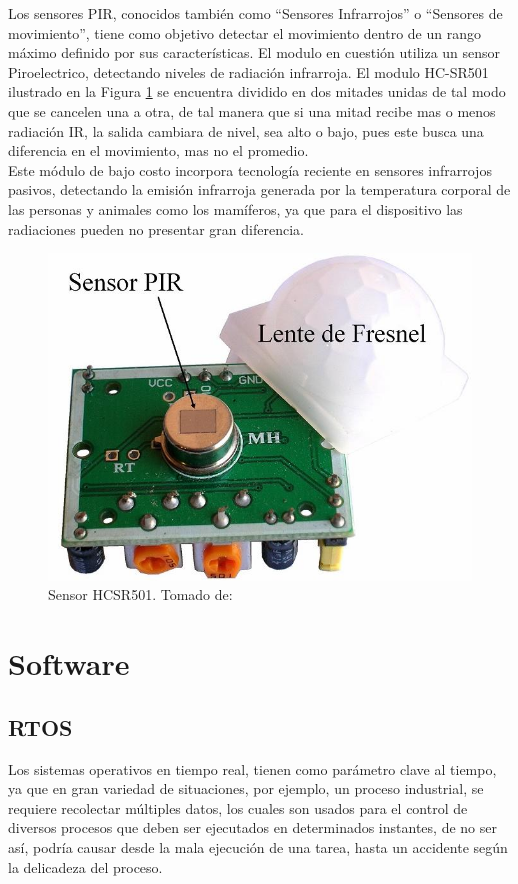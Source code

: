 Los sensores PIR, conocidos también como ``Sensores Infrarrojos'' o ``Sensores de movimiento'', tiene como objetivo detectar el movimiento dentro de un rango máximo definido por sus características. El modulo en cuestión utiliza un sensor Piroelectrico, detectando niveles de radiación infrarroja. El modulo HC-SR501 ilustrado en la Figura \ref{fig:sensor-hc-sr501-1000-m} se encuentra dividido en dos mitades unidas de tal modo que se cancelen una a otra, de tal manera que si una mitad recibe mas o menos radiación IR, la salida cambiara de nivel, sea alto o bajo, pues este busca una diferencia en el movimiento, mas no el promedio. \cite{PIR1}\\

Este módulo de bajo costo incorpora tecnología reciente en sensores infrarrojos pasivos, detectando la emisión infrarroja generada por la temperatura corporal de las personas y animales como los mamíferos, ya que para el dispositivo las radiaciones pueden no presentar gran diferencia. \cite{PIR2}\\


\begin{figure}[H]
	\centering
	\caption[Sensor HCSR501.]{Sensor HCSR501. Tomado de: \cite{PIR2}}
	\label{fig:sensor-hc-sr501-1000-m}
	\includegraphics[width=0.5\linewidth]{Imagenes/SENSOR-HC-SR501-1000-M}
\end{figure}

\section{Software}

\subsection{RTOS}

Los sistemas operativos en tiempo real, tienen como parámetro clave al tiempo, ya que en gran variedad de situaciones, por ejemplo, un proceso industrial, se requiere recolectar múltiples datos, los cuales son usados para el control de diversos procesos que deben ser ejecutados en determinados instantes, de no ser así, podría causar desde la mala ejecución de una tarea, hasta un accidente según la delicadeza del proceso.\\ 

